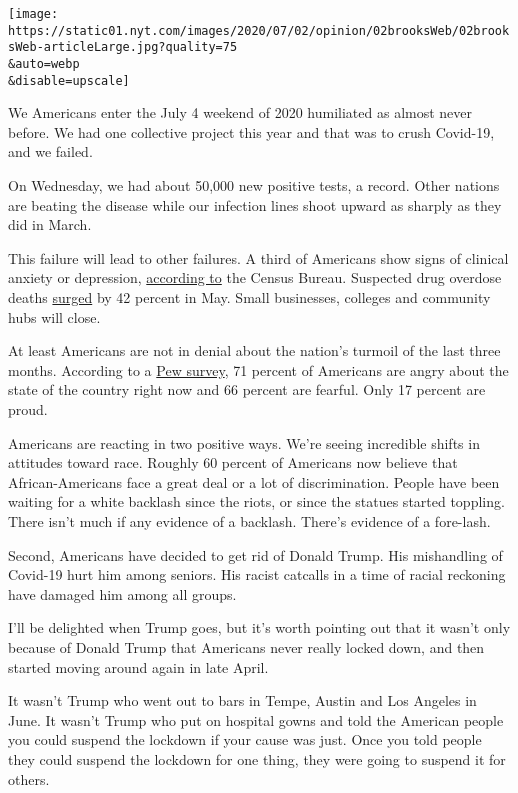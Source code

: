 \texttt{[image: https://static01.nyt.com/images/2020/07/02/opinion/02brooksWeb/02brooksWeb-articleLarge.jpg?quality=75\\\&auto=webp\\\&disable=upscale]}

We Americans enter the July 4 weekend of 2020 humiliated as almost never
before. We had one collective project this year and that was to crush
Covid-19, and we failed.

On Wednesday, we had about 50,000 new positive tests, a record. Other
nations are beating the disease while our infection lines shoot upward
as sharply as they did in March.

This failure will lead to other failures. A third of Americans show
signs of clinical anxiety or depression,
\href{https://www.washingtonpost.com/health/2020/05/26/americans-with-depression-anxiety-pandemic/?arc404=true}{according
to} the Census Bureau. Suspected drug overdose deaths
\href{https://www.washingtonpost.com/health/2020/07/01/coronavirus-drug-overdose/}{surged}
by 42 percent in May. Small businesses, colleges and community hubs will
close.

At least Americans are not in denial about the nation's turmoil of the
last three months. According to a
\href{https://www.people-press.org/2020/06/30/publics-mood-turns-grim-trump-trails-biden-on-most-personal-traits-major-issues/}{Pew
survey}, 71 percent of Americans are angry about the state of the
country right now and 66 percent are fearful. Only 17 percent are proud.

Americans are reacting in two positive ways. We're seeing incredible
shifts in attitudes toward race. Roughly 60 percent of Americans now
believe that African-Americans face a great deal or a lot of
discrimination. People have been waiting for a white backlash since the
riots, or since the statues started toppling. There isn't much if any
evidence of a backlash. There's evidence of a fore-lash.

Second, Americans have decided to get rid of Donald Trump. His
mishandling of Covid-19 hurt him among seniors. His racist catcalls in a
time of racial reckoning have damaged him among all groups.

I'll be delighted when Trump goes, but it's worth pointing out that it
wasn't only because of Donald Trump that Americans never really locked
down, and then started moving around again in late April.

It wasn't Trump who went out to bars in Tempe, Austin and Los Angeles in
June. It wasn't Trump who put on hospital gowns and told the American
people you could suspend the lockdown if your cause was just. Once you
told people they could suspend the lockdown for one thing, they were
going to suspend it for others.

